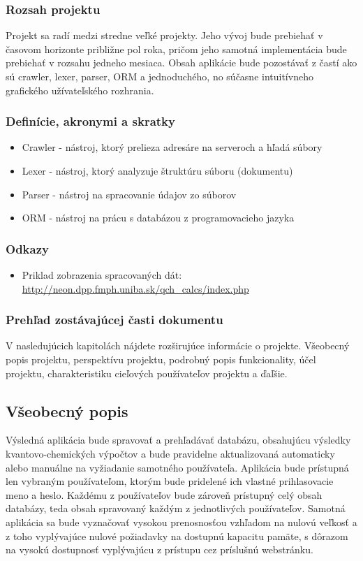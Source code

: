 \documentclass[12pt,a4paper]{article}
\begin{document}
\subsubsection{Rozsah projektu}
Projekt sa radí medzi stredne veľké projekty. Jeho vývoj bude prebiehať v časovom horizonte približne pol roka, pričom jeho samotná implementácia bude prebiehať v rozsahu jedneho mesiaca. Obsah aplikácie bude pozostávať z častí ako sú crawler, lexer, parser, ORM a jednoduchého, no súčasne intuitívneho grafického užívateľského rozhrania.

\subsubsection{Definície, akronymi a skratky}
\begin{itemize}
	\item Crawler - nástroj, ktorý prelieza adresáre na serveroch a hľadá súbory
	\item Lexer - nástroj, ktorý analyzuje štruktúru súboru (dokumentu)
	\item Parser - nástroj na spracovanie údajov zo súborov
	\item ORM - nástroj na prácu s databázou z programovacieho jazyka
\end{itemize}

\subsubsection{Odkazy}
\begin{itemize}
	\item Priklad zobrazenia spracovaných dát: \url{http://neon.dpp.fmph.uniba.sk/qch_calcs/index.php}
\end{itemize}

\subsubsection{Prehľad zostávajúcej časti dokumentu}
V nasledujúcich kapitolách nájdete rozširujúce informácie o projekte. Všeobecný popis projektu, perspektívu projektu, podrobný popis funkcionality, účel projektu, charakteristiku cieľových používateľov projektu a ďaľšie.

\subsection{Všeobecný popis}
Výsledná aplikácia bude spravovať a prehľadávať databázu, obsahujúcu výsledky kvantovo-chemických výpočtov a bude pravidelne aktualizovaná automaticky alebo manuálne na vyžiadanie samotného používateľa. Aplikácia bude prístupná len vybraným používateľom, ktorým bude pridelené ich vlastné prihlasovacie meno a heslo. Každému z používateľov bude zároveň prístupný celý obsah databázy, teda obsah spravovaný každým z jednotlivých používateľov. Samotná aplikácia sa bude vyznačovať vysokou prenosnosťou vzhľadom na nulovú veľkosť a z toho vyplývajúce nulové požiadavky na dostupnú kapacitu pamäte, s dôrazom na vysokú dostupnosť vyplývajúcu z prístupu cez príslušnú webstránku.
\end{document}
